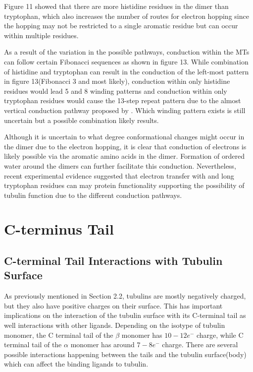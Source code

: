 \documentclass[letterpaper,final,times]{cas-dc}
\numberwithin{equation}{section}
\begin{document}
Figure 11 showed that there are more histidine residues in the dimer than tryptophan, which also increases the number of routes for electron hopping since the hopping may not be restricted to a single aromatic residue but can occur within multiple residues.

As a result of the variation in the possible pathways, conduction within the MTs can follow
certain Fibonacci sequences as shown in figure 13. While combination of histidine and tryptophan can result in the conduction of the left-most pattern in figure 13(Fibonacci 3 and
most likely), conduction within only histidine residues would lead 5 and 8 winding patterns\citep{10} and conduction within only tryptophan residues would cause the 13-step repeat pattern due to the almost vertical conduction pathway proposed by \citet{10}. Which winding pattern exists is still uncertain but a possible combination likely results.

Although it is uncertain to what degree conformational changes might occur in the dimer due to the electron hopping, it is clear that conduction of electrons is likely possible via the aromatic amino acids in the dimer. Formation of ordered water around the dimers can further facilitate this conduction. Nevertheless, recent experimental evidence suggested that electron transfer with and long tryptophan residues can may protein functionality\citep{88, 89} supporting the possibility of tubulin function due to the different conduction pathways.

\section{C-terminus Tail}
\subsection{C-terminal Tail Interactions with Tubulin Surface}
As previously mentioned in Section 2.2, tubulins are mostly negatively charged, but they also have positive charges on their surface. This has important implications on the interaction of the tubulin surface with its C-terminal tail as well interactions with other ligands. Depending on the isotype of tubulin monomer, the C terminal tail of the $\beta$ monomer has $10-12e^-$ charge, while C terminal tail of the $\alpha$ monomer has around $7-8e^{-}$ charge\citep{83}. There are several possible interactions happening between the tails and the tubulin surface(body) which can affect the binding ligands to tubulin\citep{84}.
\end{document}
